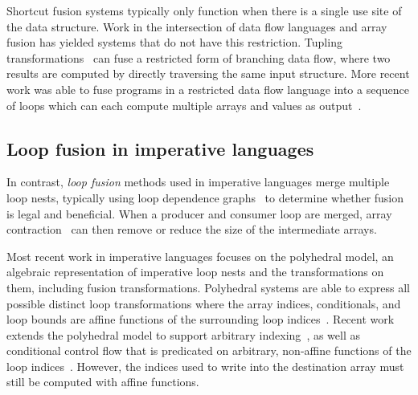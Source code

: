 Shortcut fusion systems typically only function when there is a single use site
of the data structure. Work in the intersection of data flow languages and array
fusion has yielded systems that do not have this restriction. Tupling
transformations~\cite{Hu:1997tk,Grelck:2006ci} can fuse a restricted form of
branching data flow, where two results are computed by directly traversing the
same input structure. More recent work was able to fuse programs in a restricted
data flow language into a sequence of loops which can each compute multiple
arrays and values as output~\cite{Lippmeier:2013vz,Robinson:2014ve}.


\fusion[shortcut|)]{}

\subsection{Loop fusion in imperative languages}

In contrast, \emph{loop fusion} methods used in imperative languages merge
multiple loop nests, typically using loop dependence graphs~\cite{Warren:1984ka}
to determine whether fusion is legal and beneficial. When a producer and
consumer loop are merged, array contraction~\cite{Sarkar:1991ff} can then remove
or reduce the size of the intermediate arrays.

Most recent work in imperative languages focuses on the polyhedral model, an
algebraic representation of imperative loop nests and the transformations on
them, including fusion transformations. Polyhedral systems are able to express
all possible distinct loop transformations where the array indices,
conditionals, and loop bounds are affine functions of the surrounding loop
indices~\cite{Pouchet:2011ig,Mehta:2014ir}. Recent work extends the polyhedral
model to support arbitrary indexing~\cite{Venkat:2014cg}, as well as conditional
control flow that is predicated on arbitrary, non-affine functions of the loop
indices~\cite{Benabderrahmane:2010vc}. However, the indices used to write into
the destination array must still be computed with affine functions.

